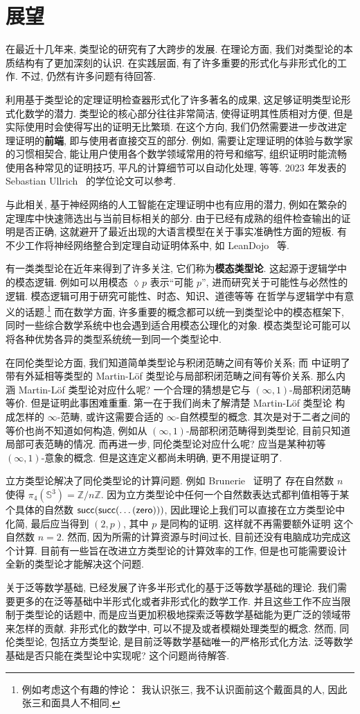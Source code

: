 \chapter{展望}
在最近十几年来, 类型论的研究有了大跨步的发展.
在理论方面, 我们对类型论的本质结构有了更加深刻的认识.
在实践层面, 有了许多重要的形式化与非形式化的工作.
不过, 仍然有许多问题有待回答.

利用基于类型论的定理证明检查器形式化了许多著名的成果,
这足够证明类型论形式化数学的潜力.
类型论的核心部分往往非常简洁, 使得证明其性质相对方便,
但是实际使用时会使得写出的证明无比繁琐.
在这个方向, 我们仍然需要进一步改进定理证明的\textbf{前端},
即与使用者直接交互的部分.
例如, 需要让定理证明的体验与数学家的习惯相契合,
能让用户使用各个数学领域常用的符号和缩写,
组织证明时能流畅使用各种常见的证明技巧,
平凡的计算细节可以自动化处理, 等等.
2023 年发表的 Sebastian Ullrich~\cite{ullrich:2023:frontend} 的学位论文可以参考.

与此相关, 基于神经网络的人工智能在定理证明中也有应用的潜力,
例如在繁杂的定理库中快速筛选出与当前目标相关的部分.
由于已经有成熟的组件检查输出的证明是否正确,
这就避开了最近出现的大语言模型在关于事实准确性方面的短板.
有不少工作将神经网络整合到定理自动证明体系中,
如 LeanDojo~\cite{yang:2023:leandojo} 等.

有一类类型论在近年来得到了许多关注, 它们称为\textbf{模态类型论}.
这起源于逻辑学中的模态逻辑.
例如可以用模态 \(\lozenge p\) 表示“可能 \(p\)”,
进而研究关于可能性与必然性的逻辑.
模态逻辑可用于研究可能性、时态、知识、道德等等
在哲学与逻辑学中有意义的话题.\footnote{例如考虑这个有趣的悖论：
我认识张三, 我不认识面前这个戴面具的人, 因此张三和面具人不相同.}
而在数学方面, 许多重要的概念都可以统一到类型论中的模态框架下,
同时一些综合数学系统中也会遇到适合用模态公理化的对象.
模态类型论可能可以将各种优势各异的类型系统统一到同一个类型论中.

在同伦类型论方面, 我们知道简单类型论与积闭范畴之间有等价关系;
而 \cite{clairambault:2014:biequivalence} 中证明了
带有外延相等类型的 Martin-L\"of 类型论与局部积闭范畴之间有等价关系.
那么内涵 Martin-L\"of 类型论对应什么呢?
一个合理的猜想是它与 \((\infty, 1)\)-局部积闭范畴等价.
但是证明此事困难重重. 第一在于我们尚未了解清楚 Martin-L\"of 类型论
构成怎样的 \(\infty\)-范畴, 或许这需要合适的 \(\infty\)-自然模型的概念.
其次是对于二者之间的等价也尚不知道如何构造,
例如从 \((\infty, 1)\)-局部积闭范畴得到类型论,
目前只知道局部可表范畴的情况.
而再进一步, 同伦类型论对应什么呢?
应当是某种初等 \((\infty, 1)\)-意象的概念.
但是这连定义都尚未明确, 更不用提证明了.

立方类型论解决了同伦类型论的计算问题.
例如 Brunerie~\cite{brunerie:2016:number} 证明了
存在自然数 \(n\) 使得 \(\pi_4(\mathbb S^3) = \mathbb Z/n\mathbb Z\).
因为立方类型论中任何一个自然数表达式都判值相等于某个具体的自然数
\(\textnormal{\textsf{succ}}(\textnormal{\textsf{succ}}(\dots (\textnormal{\textsf{zero}})))\),
因此理论上我们可以直接在立方类型论中化简, 最后应当得到
\((2, p)\), 其中 \(p\) 是同构的证明. 这样就不再需要额外证明
这个自然数 \(n = 2\). 然而, 因为所需的计算资源与时间过长,
目前还没有电脑成功完成这个计算.
目前有一些旨在改进立方类型论的计算效率的工作,
但是也可能需要设计全新的类型论才能解决这个问题.

关于泛等数学基础, \cite{ufp:2013:hottbook}
已经发展了许多半形式化的基于泛等数学基础的理论.
我们需要更多的在泛等基础中半形式化或者非形式化的数学工作.
并且这些工作不应当限制于类型论的话题中,
而是应当更加积极地探索泛等数学基础能为更广泛的领域带来怎样的贡献.
非形式化的数学中, 可以不提及或者模糊处理类型的概念.
然而, 同伦类型论, 包括立方类型论,
是目前泛等数学基础唯一的严格形式化方法.
泛等数学基础是否只能在类型论中实现呢? 这个问题尚待解答.

